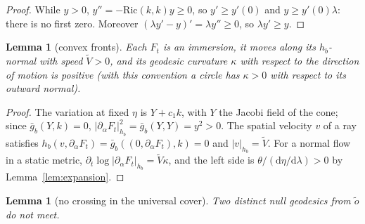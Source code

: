 \documentclass[aip,jmp,amsmath,amssymb,reprint]{revtex4-2}
\newcommand{\dd}{\mathrm{d}}
\theoremstyle{plain}
\newtheorem{lemma}[proposition]{Lemma}
\theoremstyle{definition}
\begin{document}
\begin{proof}
While $y>0$, $y''=-\mathrm{Ric}(k,k)y\ge0$, so $y'\ge y'(0)$ and $y\ge y'(0)\lambda$: there
is no first zero. Moreover $(\lambda y'-y)'=\lambda y''\ge0$, so $\lambda y'\ge y$.
\end{proof}

\begin{lemma}[convex fronts]\label{lem:fronts}
Each $F_t$ is an immersion, it moves along its $h_b$-normal with speed $\tilde V>0$, and
its geodesic curvature $\kappa$ with respect to the direction of motion is positive (with this convention a
circle has $\kappa>0$ with respect to its outward normal).
\end{lemma}

\begin{proof}
The variation at fixed $\eta$ is $Y+c_1k$, with $Y$ the Jacobi field of the cone; since
$\bar g_b(Y,k)=0$, $|\partial_\alpha F_t|^2_{h_b}=\bar g_b(Y,Y)=y^2>0$. The spatial velocity
$v$ of a ray satisfies $h_b(v,\partial_\alpha F_t)=\bar g_b((0,\partial_\alpha F_t),k)=0$ and
$|v|_{h_b}=\tilde V$. For a normal flow in a static metric,
$\partial_t\log|\partial_\alpha F_t|_{h_b}=\tilde V\kappa$, and the left side is
$\theta/(\dd\eta/\dd\lambda)>0$ by Lemma~\ref{lem:expansion}.
\end{proof}

\begin{lemma}[no crossing in the universal cover]\label{lem:nocross}
Two distinct null geodesics from $\tilde o$ do not meet.
\end{lemma}
\end{document}
